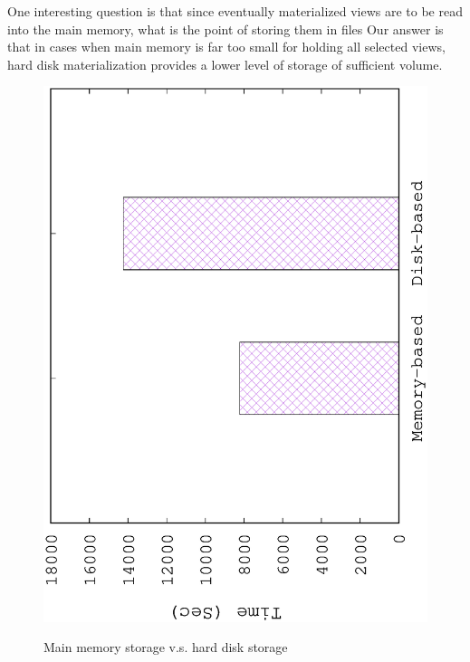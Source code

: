	One interesting question is that since eventually materialized views are to be read into the main memory, what is the point of storing them in files Our answer is that in cases when main memory is far too small for holding all selected views, hard disk materialization provides a lower level of storage of sufficient volume.
	
	\begin{figure}[H]
		\centering
		\includegraphics[scale=0.5, angle=270]{plot/disk}
		\label{fig:disk}
		\caption{Main memory storage v.s. hard disk storage}
	\end{figure}
	
